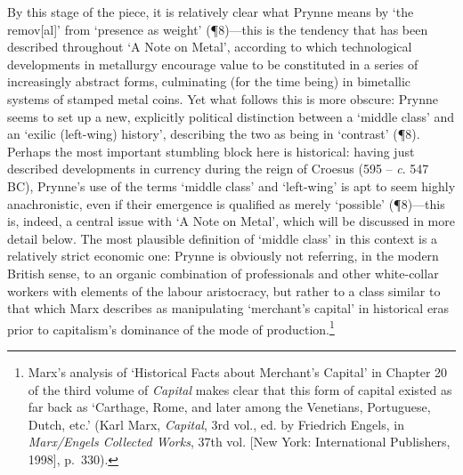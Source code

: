 \documentclass[]{article}
\begin{document}
By this stage of the piece, it is relatively clear what Prynne means by
‘the remov{[}al{]}’ from ‘presence as weight’ (¶8)—this is the tendency
that has been described throughout ‘A Note on Metal’, according to which
technological developments in metallurgy encourage value to be
constituted in a series of increasingly abstract forms, culminating (for
the time being) in bimetallic systems of stamped metal coins. Yet what
follows this is more obscure: Prynne seems to set up a new, explicitly
political distinction between a ‘middle class’ and an ‘exilic
(left-wing) history’, describing the two as being in ‘contrast’ (¶8).
Perhaps the most important stumbling block here is historical: having
just described developments in currency during the reign of Croesus (595
– \emph{c}. 547 BC), Prynne’s use of the terms ‘middle class’ and
‘left-wing’ is apt to seem highly anachronistic, even if their emergence
is qualified as merely ‘possible’ (¶8)—this is, indeed, a central issue
with ‘A Note on Metal’, which will be discussed in more detail below.
The most plausible definition of ‘middle class’ in this context is a
relatively strict economic one: Prynne is obviously not referring, in
the modern British sense, to an organic combination of professionals and
other white-collar workers with elements of the labour aristocracy, but
rather to a class similar to that which Marx describes as manipulating
‘merchant’s capital’ in historical eras prior to capitalism’s dominance
of the mode of production.\footnote{Marx’s analysis of ‘Historical Facts
  about Merchant’s Capital’ in Chapter 20 of the third volume of
  \emph{Capital} makes clear that this form of capital existed as far
  back as ‘Carthage, Rome, and later among the Venetians, Portuguese,
  Dutch, etc.’ (Karl Marx, \emph{Capital}, 3rd vol., ed. by Friedrich
  Engels, in \emph{Marx/Engels Collected Works}, 37th vol. {[}New York:
  International Publishers, 1998{]}, p.~330).}
\end{document}
